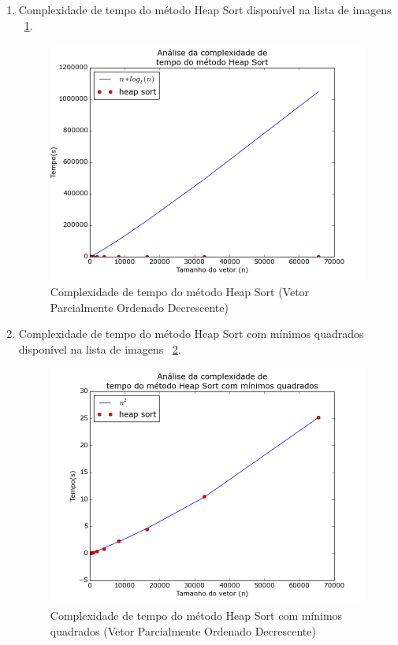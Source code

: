 \documentclass[12pt,a4paper,twoside]{report}
\begin{document}
\begin{enumerate}
\begin{enumerate}
											
											\item Complexidade de tempo do método Heap Sort disponível na lista de imagens ~\ref{fig:HeapPlot2POD}.
											\begin{figure}[!h]
												\centering
												\includegraphics[scale=0.6]{../imagens/Heap/heap_plot_2_parcialmente_ordenado_decrescente.png}
												\caption{Complexidade de tempo do método Heap Sort (Vetor Parcialmente Ordenado Decrescente) \label{fig:HeapPlot2POD}}
											\end{figure}
											
											
											\item Complexidade de tempo do método Heap Sort com mínimos quadrados disponível na lista de imagens  ~\ref{fig:HeapPlot3POD}.
											\begin{figure}[!h]
												\centering
												\includegraphics[scale=0.6]{../imagens/Heap/heap_plot_3_parcialmente_ordenado_decrescente.png}
												\caption{Complexidade de tempo do método Heap Sort com mínimos quadrados (Vetor Parcialmente Ordenado Decrescente) \label{fig:HeapPlot3POD}}
											\end{figure}
										
										\end{enumerate}
			
	
\end{enumerate}
\end{document}
